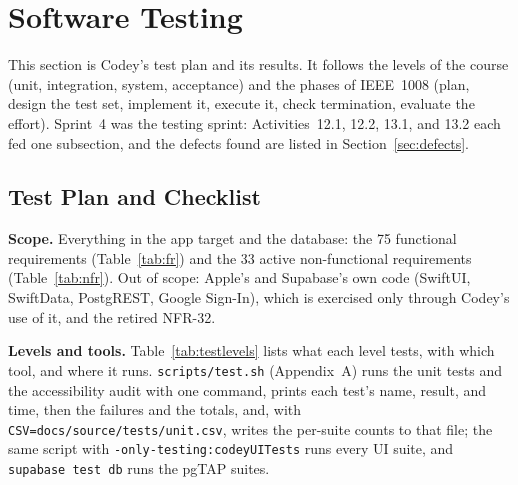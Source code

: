 \documentclass[12pt,letterpaper]{article}
\begin{document}
\section{Software Testing}\label{sec:testing}
This section is Codey's test plan and its results. It follows the levels of the
course (unit, integration, system, acceptance) and the phases of IEEE~1008 (plan,
design the test set, implement it, execute it, check termination, evaluate the
effort). Sprint~4 was the testing sprint: Activities~12.1, 12.2, 13.1, and 13.2 each
fed one subsection, and the defects found are listed in Section~\ref{sec:defects}.

\subsection{Test Plan and Checklist}\label{sec:testplan}
\textbf{Scope.} Everything in the app target and the database: the 75 functional
requirements (Table~\ref{tab:fr}) and the 33 active non-functional requirements
(Table~\ref{tab:nfr}). Out of scope: Apple's and Supabase's own code (SwiftUI,
SwiftData, PostgREST, Google Sign-In), which is exercised only through Codey's use of
it, and the retired NFR-32.

\textbf{Levels and tools.} Table~\ref{tab:testlevels} lists what each level tests,
with which tool, and where it runs. \texttt{scripts/test.sh} (Appendix~A) runs the
unit tests and the accessibility audit with one command, prints each test's name,
result, and time, then the failures and the totals, and, with
\texttt{CSV=docs/source/tests/unit.csv}, writes the per-suite counts to that file; the same script with
\texttt{-only-testing:codeyUITests} runs every UI suite, and \texttt{supabase test db}
runs the pgTAP suites.
\end{document}
